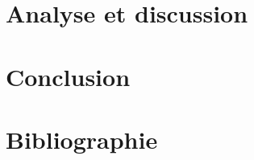 \documentclass[a4paper, 12pt]{article} %
\begin{document}
\section{Analyse et discussion}
\section{Conclusion}
\section{Bibliographie}
\end{document}
